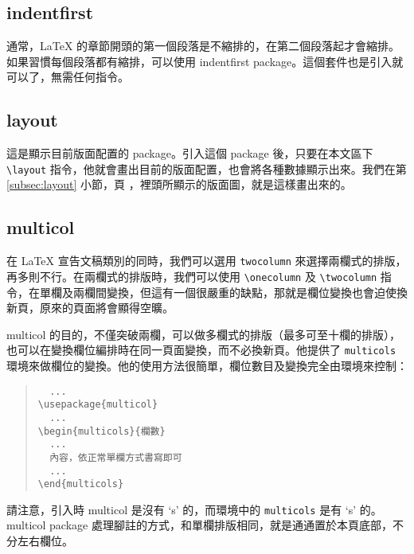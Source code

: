 \subsection{indentfirst}

通常，\LaTeX{} 的章節開頭的第一個段落是不縮排的，在第二個段落起才會縮排。如果習慣每個段落都有縮排，可以使用 \textsf{indentfirst} package。這個套件也是引入就可以了，無需任何指令。

\subsection{layout}

這是顯示目前版面配置的 package。引入這個 package 後，只要在本文區下 \verb|\layout| 指令，他就會畫出目前的版面配置，也會將各種數據顯示出來。我們在第 \ref{subsec:layout} 小節，頁 \pageref{subsec:layout}，裡頭所顯示的版面圖，就是這樣畫出來的。


\subsection{multicol}
\label{subsec:multicol}

在 \LaTeX{} 宣告文稿類別的同時，我們可以選用 \texttt{twocolumn} 來選擇兩欄式的排版，再多則不行。在兩欄式的排版時，我們可以使用 \verb|\onecolumn| 及 \verb|\twocolumn| 指令，在單欄及兩欄間變換，但這有一個很嚴重的缺點，那就是欄位變換也會迫使換新頁，原來的頁面將會顯得空曠。

\textsf{multicol} 的目的，不僅突破兩欄，可以做多欄式的排版（最多可至十欄的排版），也可以在變換欄位編排時在同一頁面變換，而不必換新頁。他提供了 \texttt{multicols} 環境來做欄位的變換。他的使用方法很簡單，欄位數目及變換完全由環境來控制：

\begin{quote}
  \begin{verbatim}
  ...
\usepackage{multicol}
  ...
\begin{multicols}{欄數}
  ...
  內容，依正常單欄方式書寫即可
  ...
\end{multicols}
\end{verbatim}
\end{quote}

請注意，引入時 \textsf{multicol} 是沒有 `s' 的，而環境中的 \texttt{multicols} 是有 `s' 的。\textsf{multicol} package 處理腳註的方式，和單欄排版相同，就是通通置於本頁底部，不分左右欄位。

